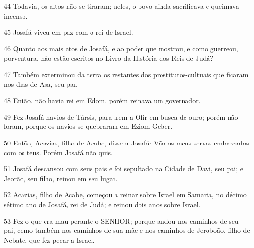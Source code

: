 \par 44 Todavia, os altos não se tiraram; neles, o povo ainda sacrificava e queimava incenso.
\par 45 Josafá viveu em paz com o rei de Israel.
\par 46 Quanto aos mais atos de Josafá, e ao poder que mostrou, e como guerreou, porventura, não estão escritos no Livro da História dos Reis de Judá?
\par 47 Também exterminou da terra os restantes dos prostitutos-cultuais que ficaram nos dias de Asa, seu pai.
\par 48 Então, não havia rei em Edom, porém reinava um governador.
\par 49 Fez Josafá navios de Társis, para irem a Ofir em busca de ouro; porém não foram, porque os navios se quebraram em Eziom-Geber.
\par 50 Então, Acazias, filho de Acabe, disse a Josafá: Vão os meus servos embarcados com os teus. Porém Josafá não quis.
\par 51 Josafá descansou com seus pais e foi sepultado na Cidade de Davi, seu pai; e Jeorão, seu filho, reinou em seu lugar.
\par 52 Acazias, filho de Acabe, começou a reinar sobre Israel em Samaria, no décimo sétimo ano de Josafá, rei de Judá; e reinou dois anos sobre Israel.
\par 53 Fez o que era mau perante o SENHOR; porque andou nos caminhos de seu pai, como também nos caminhos de sua mãe e nos caminhos de Jeroboão, filho de Nebate, que fez pecar a Israel.


